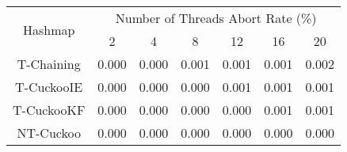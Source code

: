 \begin{tabular}{|c|c|c|c|c|c|c|}
\hline
\multirow{2}{*}{Hashmap} & \multicolumn{6}{c|}{Number of Threads Abort Rate (\%)}\\\cline{2-7}& 2 & 4 & 8 & 12 & 16 & 20\\
\hline
\hline
T-Chaining & 0.000 & 0.000 & 0.001 & 0.001 & 0.001 & 0.002\\
T-CuckooIE & 0.000 & 0.000 & 0.000 & 0.001 & 0.001 & 0.001\\
T-CuckooKF & 0.000 & 0.000 & 0.000 & 0.000 & 0.001 & 0.001\\
NT-Cuckoo & 0.000 & 0.000 & 0.000 & 0.000 & 0.000 & 0.000\\
\hline
\end{tabular}
